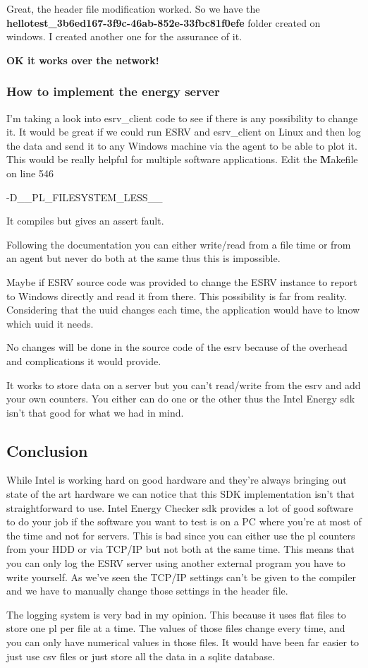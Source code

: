 Great, the header file modification worked. So we have the  \textbf{hellotest\_3b6ed167-3f9c-46ab-852e-33fbc81f0efe}  folder created on windows. I created another one for the assurance of it.

\textbf{OK it works over the network!}

\subsubsection{How to implement the energy server}
I'm taking a look into esrv\_client code to see if there is any possibility to change it. It would be great if we could run ESRV and esrv\_client on Linux  and  then log the data and send it to any Windows machine via the agent to be able to plot it. This would be really helpful for multiple software applications. 
Edit the \textbf Makefile on line 546
\begin{codelisting}
-D__PL_FILESYSTEM_LESS__ \
\end{codelisting}
It compiles but gives an assert fault.

Following the documentation you can either write/read from a file time or from an agent but never do both at the same thus this is impossible. 

Maybe if ESRV source code was provided to change the ESRV instance to report to Windows directly and read it from there. This possibility is far from reality. Considering that the \gls{uuid} changes each time, the application would have to know which \gls{uuid} it needs.

No changes will be done in the source code of the esrv because of the overhead and complications it would provide.

It works to store data on a server but you can't read/write from the esrv and add your own counters. You either can do one or the other thus the Intel Energy \gls{sdk} isn't that good for what we had in mind.


\subsection{Conclusion}
While Intel is working hard on good hardware and they're always bringing out state of the art hardware we can notice that this SDK implementation isn't that straightforward to use.
Intel Energy Checker \gls{sdk} provides a lot of good software to do your job if the software you want to test is on a PC where you're at most of the time and not for servers.
This is bad since you can either use the \gls{pl} counters from your HDD or via TCP/IP but not both at the same time. 
This means that you can only log the ESRV server using another external program you have to write yourself.
As we've seen the TCP/IP settings can't be given to the compiler and we have to manually change those settings in the header file.

The logging system is very bad in my opinion. This because it uses flat files to store one \gls{pl} per file at a time. The values of those files change every time, and you can only have numerical values in those files. It would have been far easier to just use \gls{csv} files  or just store all the data in a \gls{sqlite} database.


